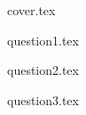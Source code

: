 \documentclass[a4paper]{article}
\begin{document}
{cover.tex}

{question1.tex}

{question2.tex}

{question3.tex}
\end{document}

